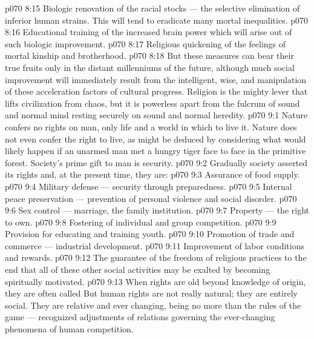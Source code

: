 \vs p070 8:15 \bibnobreakspace Biologic renovation of the racial stocks --- the selective elimination of inferior human strains. This will tend to eradicate many mortal inequalities.
\vs p070 8:16 \bibnobreakspace Educational training of the increased brain power which will arise out of such biologic improvement.
\vs p070 8:17 \bibnobreakspace Religious quickening of the feelings of mortal kinship and brotherhood.
\vs p070 8:18 \pc But these measures can bear their true fruits only in the distant millenniums of the future, although much social improvement will immediately result from the intelligent, wise, and  manipulation of these acceleration factors of cultural progress. Religion is the mighty lever that lifts civilization from chaos, but it is powerless apart from the fulcrum of sound and normal mind resting securely on sound and normal heredity.
\vs p070 9:1 Nature confers no rights on man, only life and a world in which to live it. Nature does not even confer the right to live, as might be deduced by considering what would likely happen if an unarmed man met a hungry tiger face to face in the primitive forest. Society’s prime gift to man is security.
\vs p070 9:2 \pc Gradually society asserted its rights and, at the present time, they are:
\vs p070 9:3 \bibnobreakspace Assurance of food supply.
\vs p070 9:4 \bibnobreakspace Military defense --- security through preparedness.
\vs p070 9:5 \bibnobreakspace Internal peace preservation --- prevention of personal violence and social disorder.
\vs p070 9:6 \bibnobreakspace Sex control --- marriage, the family institution.
\vs p070 9:7 \bibnobreakspace Property --- the right to own.
\vs p070 9:8 \bibnobreakspace Fostering of individual and group competition.
\vs p070 9:9 \bibnobreakspace Provision for educating and training youth.
\vs p070 9:10 \bibnobreakspace Promotion of trade and commerce --- industrial development.
\vs p070 9:11 \bibnobreakspace Improvement of labor conditions and rewards.
\vs p070 9:12 \bibnobreakspace The guarantee of the freedom of religious practices to the end that all of these other social activities may be exalted by becoming spiritually motivated.
\vs p070 9:13 \pc When rights are old beyond knowledge of origin, they are often called  But human rights are not really natural; they are entirely social. They are relative and ever changing, being no more than the rules of the game --- recognized adjustments of relations governing the ever\hyp{}changing phenomena of human competition.
